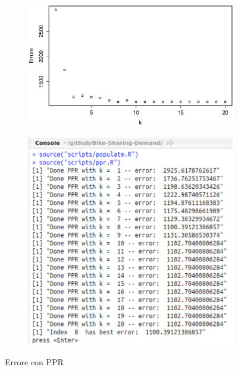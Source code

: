 \begin{figure}[H]
        \begin{subfigure}{0.4\textwidth}
          \includegraphics[width=\columnwidth]{images/non-linear/ppr-error-plot.eps}
        \end{subfigure}
        \hspace*{\fill}
        \begin{subfigure}{0.4\textwidth}
          \includegraphics[width=\columnwidth]{images/non-linear/ppr-error-data.eps}
        \end{subfigure}

        \caption{Errore con PPR}\label{fig:ppr-error}
\end{figure}

